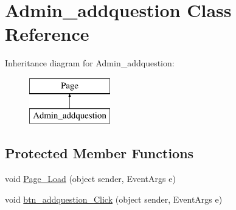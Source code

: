 \hypertarget{class_admin__addquestion}{}\section{Admin\+\_\+addquestion Class Reference}
\label{class_admin__addquestion}
Inheritance diagram for Admin\+\_\+addquestion\+:\begin{figure}[H]
\begin{center}
\leavevmode
\includegraphics[height=2.000000cm]{class_admin__addquestion}
\end{center}
\end{figure}
\subsection*{Protected Member Functions}
\begin{DoxyCompactItemize}
\item 
void \mbox{\hyperlink{class_admin__addquestion_aebc27b7679568fb4a4f966a8a40f7363}{Page\+\_\+\+Load}} (object sender, Event\+Args e)
\item 
void \mbox{\hyperlink{class_admin__addquestion_a814cc6db038926692c3cecdcff856b72}{btn\+\_\+addquestion\+\_\+\+Click}} (object sender, Event\+Args e)
\end{DoxyCompactItemize}

